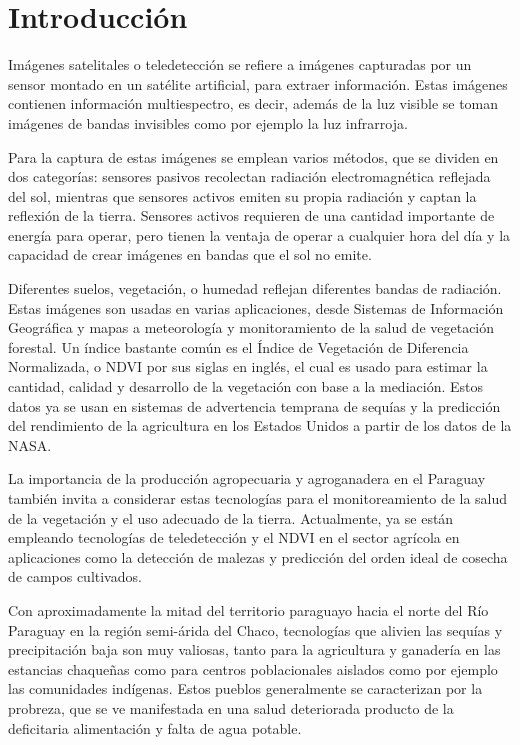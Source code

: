 \section{Introducción}

Imágenes satelitales o teledetección se refiere a imágenes capturadas por un sensor montado en un satélite artificial,
para extraer información. Estas imágenes contienen información multiespectro, es decir, además de la luz visible se
toman imágenes de bandas invisibles como por ejemplo la luz infrarroja. \autocite{globalforestlink-how-sat-imaging-work}

Para la captura de estas imágenes se emplean varios métodos, que se dividen en dos categorías: sensores pasivos
recolectan radiación electromagnética reflejada del sol, mientras que sensores activos emiten su propia radiación y
captan la reflexión de la tierra. Sensores activos requieren de una cantidad importante de energía para operar, pero
tienen la ventaja de operar a cualquier hora del día y la capacidad de crear imágenes en bandas que el sol no emite.
\autocite{globalforestlink-how-sat-imaging-work}

Diferentes suelos, vegetación, o humedad reflejan diferentes bandas de radiación. Estas imágenes son usadas en varias
aplicaciones, desde Sistemas de Información Geográfica y mapas a meteorología y monitoramiento de la salud de
vegetación forestal. Un índice bastante común es el Índice de Vegetación de Diferencia Normalizada, o NDVI por sus
siglas en inglés, el cual es usado para estimar la cantidad, calidad y desarrollo de la vegetación con base a la
mediación. Estos datos ya se usan en sistemas de advertencia temprana de sequías y la predicción del rendimiento de la
agricultura en los Estados Unidos a partir de los datos de la NASA. \autocite{earthdata-vegetation}

La importancia de la producción agropecuaria y agroganadera en el Paraguay también invita a considerar estas
tecnologías para el monitoreamiento de la salud de la vegetación y el uso adecuado de la tierra. Actualmente, ya se
están empleando tecnologías de teledetección y el NDVI en el sector agrícola en aplicaciones como la detección de
malezas y predicción del orden ideal de cosecha de campos cultivados. \autocite{onesoil-agricultura-paraguay}

Con aproximadamente la mitad del territorio paraguayo hacia el norte del Río Paraguay en la región semi-árida del
Chaco, tecnologías que alivien las sequías y precipitación baja son muy valiosas, tanto para la agricultura y ganadería
en las estancias chaqueñas como para centros poblacionales aislados como por ejemplo las comunidades indígenas. Estos
pueblos generalmente se caracterizan por la probreza, que se ve manifestada en una salud deteriorada producto de la
deficitaria alimentación y falta de agua potable.

